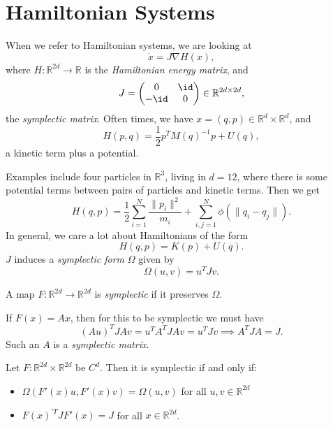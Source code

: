 \documentclass[12pt]{article}
\begin{document}

\newpage

\section{Hamiltonian Systems}%
\label{sec:hams}

When we refer to Hamiltonian systems, we are looking at
\[
\dot x = J \nabla H(x),
\]
where $H : \mathbb{R}^{2d} \to \mathbb{R}$ is the \emph{Hamiltonian energy matrix}, and
\[
J =
\begin{pmatrix}
	0 & \id \\
	-\id & 0
\end{pmatrix} \in \mathbb{R}^{2d \times 2d},
\]
the \emph{symplectic matrix}. Often times, we have $x = (q, p) \in \mathbb{R}^{d} \times \mathbb{R}^{d}$, and
\[
H(p, q) = \frac 12 p^{T}M(q)^{-1} p + U(q),
\]
a kinetic term plus a potential.

Examples include four particles in $\mathbb{R}^3$, living in $d = 12$, where there is some potential terms between pairs of particles and kinetic terms. Then we get
\[
H(q, p) = \frac 12 \sum_{i = 1}^{N} \frac{\|p_i\|^2}{m_i} + \sum_{i, j = 1}^{N} \phi(\|q_i - q_j\|).
\]
In general, we care a lot about Hamiltonians of the form
\[
H(q, p) = K(p) + U(q).
\]
$J$ induces a \emph{symplectic form} $\Omega$ given by
\[
\Omega(u, v) = u^{T} J v.
\]
\begin{definition}
	A map $F : \mathbb{R}^{2d} \to \mathbb{R}^{2d}$ is \emph{symplectic} if it preserves $\Omega$.
\end{definition}

\begin{exbox}
	If $F(x) = Ax$, then for this to be symplectic we must have
	\[
		(A u)^{T} J A v = u^{T} A^{T} J A v = u^{T} J v \implies A^{T} J A = J.
	\]
	Such an $A$ is a \emph{symplectic matrix}.
\end{exbox}

\begin{proposition}
	Let $F : \mathbb{R}^{2d} \times \mathbb{R}^{2d}$ be $C^{d}$. Then it is symplectic if and only if:
	\begin{itemize}
		\item $\Omega(F'(x) u, F'(x) v) = \Omega(u, v)$ for all $u, v \in \mathbb{R}^{2d}$ 
		\item $F(x)^{'T} J F'(x) = J$ for all $x \in \mathbb{R}^{2d}$.
	\end{itemize}	
\end{proposition}
\end{document}
